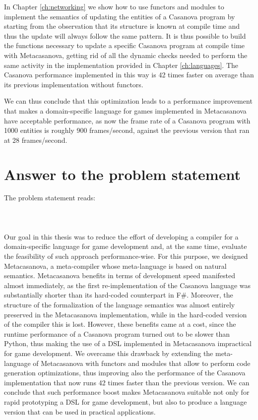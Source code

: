 In Chapter \ref{ch:networking} we show how to use functors and modules to implement the semantics of updating the entities of a Casanova program by starting from the observation that its structure is known at compile time and thus the update will always follow the same pattern. It is thus possible to build the functions necessary to update a specific Casanova program at compile time with Metacasanova, getting rid of all the dynamic checks needed to perform the same activity in the implementation provided in Chapter \ref{ch:languages}. The Casanova performance implemented in this way is 42 times faster on average than its previous implementation without functors.

We can thus conclude that this optimization leads to a performance improvement that makes a domain-specific language for games implemented in Metacasanova have acceptable performance, as now the frame rate of a Casanova program with 1000 entities is roughly 900 frames/second, against the previous version that ran at 28 frames/second.

\section{Answer to the problem statement}
\label{subsec:ch_conclusion_problem_statement}
The problem statement reads:\\\\
\\\\

Our goal in this thesis was to reduce the effort of developing a compiler for a domain-specific language for game development and, at the same time, evaluate the feasibility of such approach performance-wise. For this purpose, we designed Metacasanova, a meta-compiler whose meta-language is based on natural semantics. Metacasanova benefits in terms of development speed manifested almost immediately, as the first re-implementation of the Casanova language was substantially shorter than its hard-coded counterpart in F\#. Moreover, the structure of the formalization of the language semantics was almost entirely preserved in the Metacasanova implementation, while in the hard-coded version of the compiler this is lost. However, these benefits came at a cost, since the runtime performance of a Casanova program turned out to be slower than Python, thus making the use of a DSL implemented in Metacasanova impractical for game development. We overcame this drawback by extending the meta-language of Metacasanova with functors and modules that allow to perform code generation optimizations, thus improving also the performance of the Casanova implementation that now runs 42 times faster than the previous version. We can conclude that such performance boost makes Metacasanova suitable not only for rapid prototyping a DSL for game development, but also to produce a language version that can be used in practical applications.

